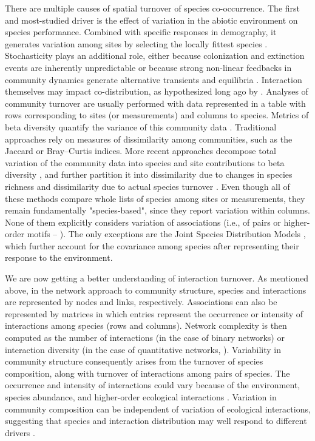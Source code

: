 \documentclass[12pt]{article}
\begin{document}
There are multiple causes of spatial turnover of species co-occurrence. The
first and most-studied driver is the effect of variation in the abiotic
environment on species performance. Combined with specific responses in
demography, it generates variation among sites by selecting the locally
fittest species \citep{Leibold2004a}. Stochasticity plays an additional role,
either because colonization and extinction events \citep{Hanski1999} are
inherently unpredictable or because strong non-linear feedbacks in community
dynamics generate alternative transients and equilibria \citep{Chase2007,
Vellend2014}. Interaction themselves may impact co-distribution, as
hypothesized long ago by \citet{Diamond1975}. Analyses of community
turnover are usually performed with data represented in a table with rows
corresponding to sites (or measurements) and columns to species. Metrics of
beta diversity quantify the variance of this community data
\citep{Legendre2005}. Traditional approaches rely on measures of dissimilarity
among communities, such as the Jaccard or Bray–Curtis indices. More recent
approaches decompose total variation of the community data into species and
site contributions to beta diversity \citep{Legendre2013}, and further
partition it into dissimilarity due to changes in species richness and
dissimilarity due to actual species turnover \citep{Baselga2010}. Even
though all of these methods compare whole lists of species among sites or
measurements, they remain fundamentally "species-based", since they report
variation within columns. None of them explicitly considers variation of
associations (i.e., of pairs or higher-order motifs – \citealt{Stouffer2007}).
The only exceptions are the Joint Species Distribution Models
\citep{Warton2015, Ovaskainen2017}, which further account for the covariance
among species after representing their response to the environment.

We are now getting a better understanding of interaction turnover. As
mentioned above, in the network approach to community structure, species and
interactions are represented by nodes and links, respectively. Associations
can also be represented by matrices in which entries represent the occurrence
or intensity of interactions among species (rows and columns). Network
complexity is then computed as the number of interactions (in the case of
binary networks) or interaction diversity (in the case of quantitative
networks, \citealt{Bersier2002}). Variability in community structure
consequently arises from the turnover of species composition, along with
turnover of interactions among pairs of species. The occurrence and intensity
of interactions could vary because of the environment, species abundance, and
higher-order ecological interactions \citep{Poisot2015a}. Variation in community
composition can be independent of variation of ecological
interactions, suggesting that species and interaction distribution may well
respond to different drivers \citep{Poisot2012}.
\end{document}
